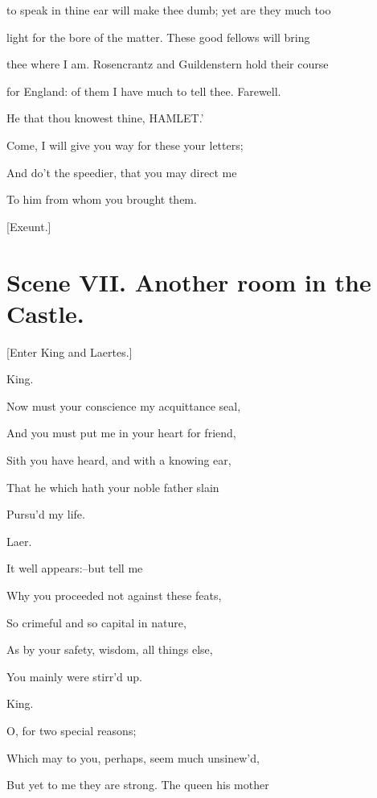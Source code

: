 \documentclass[12pt]{book}
\begin{document}
to speak in thine ear will make thee dumb; yet are they much too

light for the bore of the matter. These good fellows will bring

thee where I am. Rosencrantz and Guildenstern hold their course

for England: of them I have much to tell thee. Farewell.

He that thou knowest thine,       HAMLET.'



Come, I will give you way for these your letters;

And do't the speedier, that you may direct me

To him from whom you brought them.



[Exeunt.]







\section*{Scene VII. Another room in the Castle.}



[Enter King and Laertes.]



King.

Now must your conscience my acquittance seal,

And you must put me in your heart for friend,

Sith you have heard, and with a knowing ear,

That he which hath your noble father slain

Pursu'd my life.



Laer.

It well appears:--but tell me

Why you proceeded not against these feats,

So crimeful and so capital in nature,

As by your safety, wisdom, all things else,

You mainly were stirr'd up.



King.

O, for two special reasons;

Which may to you, perhaps, seem much unsinew'd,

But yet to me they are strong. The queen his mother
\end{document}
